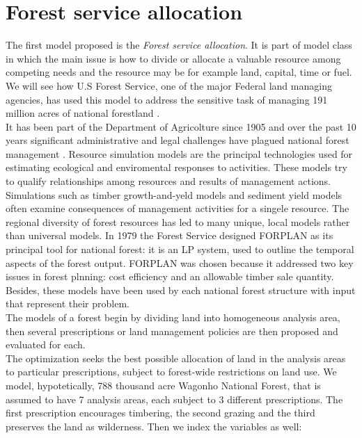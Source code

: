 \documentclass[a4paper,10 pt,titlepage,twoside]{book}
\theoremstyle{plain}
\theoremstyle{definition}
\theoremstyle{remark}
\begin{document}
\section{Forest service allocation} 
The first model proposed is the \textit{Forest service allocation}. It is part of model class in which the main issue is how to divide or allocate a valuable resource among competing needs and the resource may be for example land, capital, time or fuel. We will see how U.S Forest Service, one of the major Federal land managing agencies, has used this model to address the sensitive task of managing 191 million acres of national forestland \cite{(Natural)}.\\
It has been part of the Department of Agricolture since 1905 and over the past 10 years significant administrative and legal challenges have plagued national forest management \cite{ForSer}. Resource simulation models are the principal technologies used for estimating ecological and enviromental responses to activities. These models try to qualify relationships among resources and results of management actions. Simulations such as timber growth-and-yeld models and sediment yield models often examine consequences of management activities for a singele resource. The regional diversity of forest resources has led to many unique, local models rather than universal models. In 1979 the Forest Service designed FORPLAN as its principal tool for national forest: it is an LP system, used to outline the temporal aspects of the forest output. FORPLAN was chosen because it addressed two key issues in forest plnning: cost efficiency and an allowable timber sale quantity. Besides, these models have been used by each national forest structure with input that represent their problem.\\
The models of a forest begin by dividing land into homogeneous analysis area, then several prescriptions or land management policies are then proposed and evaluated for each. \\The optimization seeks the best possible allocation of land in the analysis areas to particular prescriptions, subject to forest-wide restrictions on land use.
We model, hypotetically, 788 thousand acre Wagonho National Forest, that is assumed to have 7 analysis areas, each subject to 3 different prescriptions. The first prescription encourages timbering, the second grazing and the third preserves the land as wilderness. Then we index the variables as well:
\end{document}
